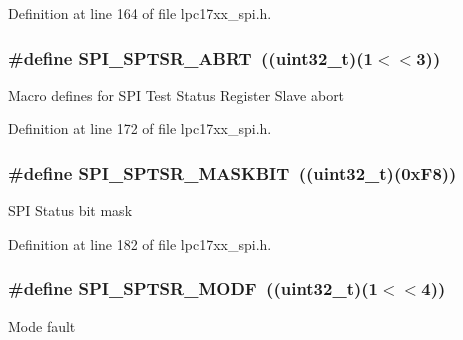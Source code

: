 \-Definition at line 164 of file lpc17xx\-\_\-spi.\-h.

\hypertarget{group___s_p_i___private___macros_gaa6ce77ab27a3cfea533c38381c68dfc5}{
\subsubsection[{\-S\-P\-I\-\_\-\-S\-P\-T\-S\-R\-\_\-\-A\-B\-R\-T}]{\setlength{\rightskip}{0pt plus 5cm}\#define {\bf \-S\-P\-I\-\_\-\-S\-P\-T\-S\-R\-\_\-\-A\-B\-R\-T}~((uint32\-\_\-t)(1$<$$<$3))}}\label{group___s_p_i___private___macros_gaa6ce77ab27a3cfea533c38381c68dfc5}
\-Macro defines for \-S\-P\-I \-Test \-Status \-Register \-Slave abort 

\-Definition at line 172 of file lpc17xx\-\_\-spi.\-h.

\hypertarget{group___s_p_i___private___macros_gaf959c2746aff54b374dae105026b8b99}{
\subsubsection[{\-S\-P\-I\-\_\-\-S\-P\-T\-S\-R\-\_\-\-M\-A\-S\-K\-B\-I\-T}]{\setlength{\rightskip}{0pt plus 5cm}\#define {\bf \-S\-P\-I\-\_\-\-S\-P\-T\-S\-R\-\_\-\-M\-A\-S\-K\-B\-I\-T}~((uint32\-\_\-t)(0x\-F8))}}\label{group___s_p_i___private___macros_gaf959c2746aff54b374dae105026b8b99}
\-S\-P\-I \-Status bit mask 

\-Definition at line 182 of file lpc17xx\-\_\-spi.\-h.

\hypertarget{group___s_p_i___private___macros_ga8d673cfa305f5f811f2c0dbb98532a44}{
\subsubsection[{\-S\-P\-I\-\_\-\-S\-P\-T\-S\-R\-\_\-\-M\-O\-D\-F}]{\setlength{\rightskip}{0pt plus 5cm}\#define {\bf \-S\-P\-I\-\_\-\-S\-P\-T\-S\-R\-\_\-\-M\-O\-D\-F}~((uint32\-\_\-t)(1$<$$<$4))}}\label{group___s_p_i___private___macros_ga8d673cfa305f5f811f2c0dbb98532a44}
\-Mode fault 

